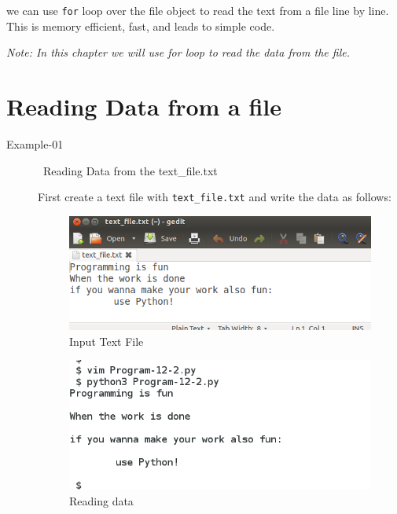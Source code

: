 \documentclass[11pt,a4paper]{article}
\begin{document}
we can use \texttt{for} loop over the file object to read the text from a file line by line. This is memory efficient, fast, and leads to simple code. 

\emph{Note: In this chapter we will use for loop to read the data from the file.}

\section*{Reading Data from a file}

\begin{description}
\item[Example-01 ]\ Reading Data from the text\_file.txt

First create a text file with \texttt{text\_file.txt} and write the data as follows:

\begin{figure}[ht]
\begin{center}
\includegraphics[scale=0.6]{Reading_Data.png}
\caption{Input Text File}
\label{Input Text File}
\end{center}
\end{figure}



\begin{figure}[ht]
\begin{center}
\includegraphics[scale=0.5]{Output-12-2.png}
\caption{Reading data}
\label{Reading data}
\end{center}
\end{figure}


\end{description}
\end{document}
